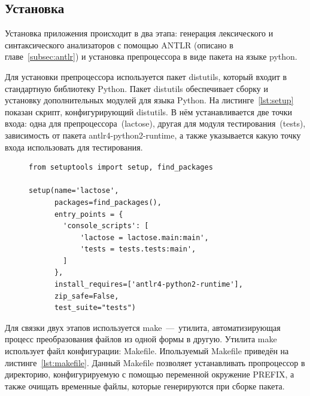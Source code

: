 \documentclass[12pt,a4paper,oneside]{extarticle}
\begin{document}
    \subsection{Установка}
        Установка приложения происходит в два этапа: генерация лексического и синтаксического анализаторов с помощью ANTLR (описано в главе~\ref{subsec:antlr}) и установка препроцессора в виде пакета на языке python.
        
        Для установки препроцессора используется пакет distutils, который входит в стандартную библиотеку Python.
        Пакет distutils обеспечивает сборку и установку дополнительных модулей для языка Python.
        На листинге~\ref{lst:setup} показан скрипт, конфигурирующий distutils.
        В нём устанавливается две точки входа: одна для препроцессора~(lactose), другая для модуля тестирования~(tests), зависимость от пакета antlr4-python2-runtime, а также указывается какую точку входа использовать для тестирования.

        \begin{figure}[h!]  
            \begin{lstlisting}[label={lst:setup},caption={Cкрипт конфигурации для утилиты distutils},captionpos=b]
from setuptools import setup, find_packages

setup(name='lactose',
      packages=find_packages(),
      entry_points = {
        'console_scripts': [
            'lactose = lactose.main:main',
            'tests = tests.tests:main',
        ]
      },
      install_requires=['antlr4-python2-runtime'],
      zip_safe=False,
      test_suite="tests")

            \end{lstlisting}
        \end{figure}

        Для связки двух этапов используется make~---~утилита, автоматизирующая процесс преобразования файлов из одной формы в другую.
        Утилита make использует файл конфигурации: Makefile.
        Ипользуемый Makefile приведён на листинге~\ref{lst:makefile}.
        Данный Makefile позволяет устанавливать пропроцессор в директорию, конфигурируемую с помощью переменной окружение PREFIX, а также очищать временные файлы, которые генерируются при сборке пакета.
\end{document}
